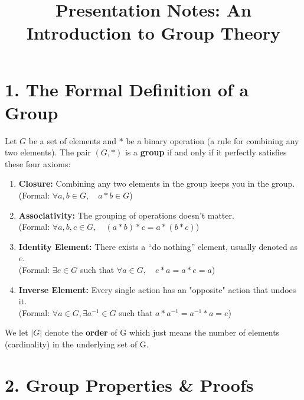 \documentclass[12pt]{article}
\title{\textbf{Presentation Notes: An Introduction to Group Theory}}
\date{}
\begin{document}
\maketitle

\section*{1. The Formal Definition of a Group}

\begin{mdframed}
    Let $G$ be a set of elements and $*$ be a binary operation (a rule for combining any two elements). The pair $(G, *)$ is a \textbf{group} if and only if it perfectly satisfies these four axioms:
\end{mdframed}

\begin{enumerate}
    \item \textbf{Closure:} Combining any two elements in the group keeps you in the group. \\
          (Formal: $\forall a, b \in G, \quad a * b \in G$)
    \item \textbf{Associativity:} The grouping of operations doesn't matter. \\
          (Formal: $\forall a, b, c \in G, \quad (a * b) * c = a * (b * c)$)
    \item \textbf{Identity Element:} There exists a ``do nothing'' element, usually denoted as $e$. \\
          (Formal: $\exists e \in G$ such that $\forall a \in G, \quad e * a = a * e = a$)
    \item \textbf{Inverse Element:} Every single action has an "opposite" action that undoes it. \\
          (Formal: $\forall a \in G, \exists a^{-1} \in G$ such that $a * a^{-1} = a^{-1} * a = e$)
\end{enumerate}

We let $|G|$ denote the \textbf{order} of G which just means the number of elements (cardinality) in the underlying set of G.

\section*{2. Group Properties \& Proofs}
\end{document}
